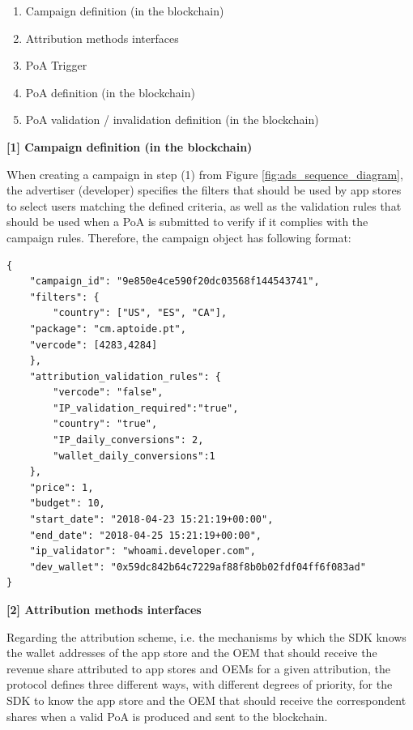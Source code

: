 \begin{enumerate}
\item Campaign definition (in the blockchain)
\item Attribution methods interfaces
\item PoA Trigger
\item PoA definition (in the blockchain)
\item PoA validation / invalidation definition (in the blockchain)
\end{enumerate}

\medskip

{\bf [1] Campaign definition (in the blockchain) }

When creating a campaign in step \textsf{(1)} from Figure \ref{fig:ads_sequence_diagram}, the advertiser (developer) specifies the filters that should be used by app stores to select users matching the defined criteria, as well as the validation rules that should be used when a \textsf{PoA} is submitted to verify if it complies with the campaign rules. Therefore, the campaign object has following format:
\begin{tcolorbox}[enhanced jigsaw,sharp corners, drop fuzzy shadow=ShadowColor]
\begin{lstlisting}[xleftmargin=0.05\textwidth]
{
    "campaign_id": "9e850e4ce590f20dc03568f144543741",
    "filters": {
        "country": ["US", "ES", "CA"],
	"package": "cm.aptoide.pt",
	"vercode": [4283,4284]
    },
    "attribution_validation_rules": {
        "vercode": "false",
        "IP_validation_required":"true",
        "country": "true",
        "IP_daily_conversions": 2,
        "wallet_daily_conversions":1
    },
    "price": 1,
    "budget": 10,
    "start_date": "2018-04-23 15:21:19+00:00",
    "end_date": "2018-04-25 15:21:19+00:00",
    "ip_validator": "whoami.developer.com",
    "dev_wallet": "0x59dc842b64c7229af88f8b0b02fdf04ff6f083ad"
}
\end{lstlisting}
\end{tcolorbox}

\medskip

{\bf [2] Attribution methods interfaces}

Regarding the attribution scheme, i.e. the mechanisms by which the SDK knows the wallet addresses of the app store and the OEM that should receive the revenue share attributed to app stores and OEMs for a given attribution, the protocol defines three different ways, with different degrees of priority, for the SDK to know the app store and the OEM that should receive the correspondent shares when a valid \textsf{PoA} is produced and sent to the blockchain. 

